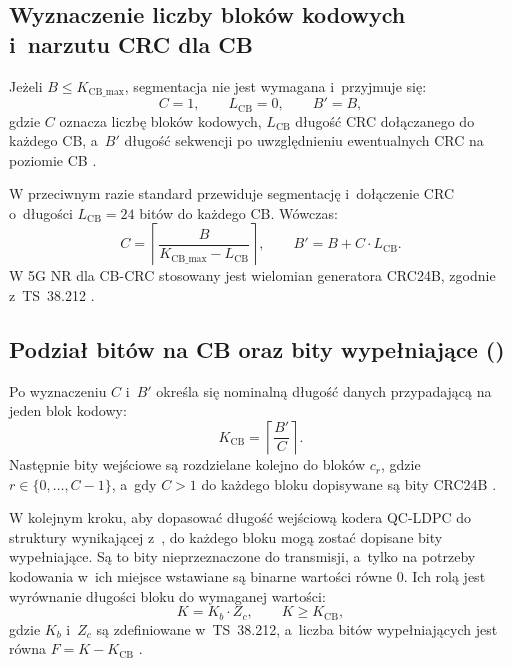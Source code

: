 \subsection{Wyznaczenie liczby bloków kodowych i~narzutu CRC dla CB}
Jeżeli $B \le K_{\mathrm{CB\_max}}$, segmentacja nie jest wymagana i~przyjmuje się:
\begin{equation}
C = 1,\qquad L_{\mathrm{CB}} = 0,\qquad B' = B,
\label{eq:seg_case_no}
\end{equation}
gdzie $C$ oznacza liczbę bloków kodowych, $L_{\mathrm{CB}}$ długość CRC dołączanego do każdego CB, a~$B'$ długość sekwencji po uwzględnieniu ewentualnych CRC na poziomie CB \cite{bib:3gpp_38212}.

W przeciwnym razie standard przewiduje segmentację i~dołączenie CRC o~długości $L_{\mathrm{CB}} = 24$ bitów do każdego CB. Wówczas:
\begin{equation}
C = \left\lceil \frac{B}{K_{\mathrm{CB\_max}} - L_{\mathrm{CB}}} \right\rceil,\qquad
B' = B + C \cdot L_{\mathrm{CB}}.
\label{eq:seg_case_yes}
\end{equation}
W 5G NR dla CB-CRC stosowany jest wielomian generatora CRC24B, zgodnie z~TS~38.212 \cite{bib:3gpp_38212}.

\subsection{Podział bitów na CB oraz bity wypełniające ()}
Po wyznaczeniu $C$ i~$B'$ określa się nominalną długość danych przypadającą na jeden blok kodowy:
\begin{equation}
K_{\mathrm{CB}} = \left\lceil\frac{B'}{C}\right\rceil.
\label{eq:seg_kprime}
\end{equation}
Następnie bity wejściowe są rozdzielane kolejno do bloków $c_r$, gdzie $r \in \{0,\dots,C-1\}$, a~gdy $C>1$ do każdego bloku dopisywane są bity CRC24B \cite{bib:3gpp_38212}.

W kolejnym kroku, aby dopasować długość wejściową kodera QC-LDPC do struktury wynikającej z~, do każdego bloku mogą zostać dopisane bity wypełniające. Są to bity nieprzeznaczone do transmisji, a~tylko na potrzeby kodowania w~ich miejsce wstawiane są binarne wartości równe 0. Ich rolą jest wyrównanie długości bloku do wymaganej wartości:
\begin{equation}
K = K_b \cdot Z_c,\qquad K \ge K_{\mathrm{CB}},
\label{eq:seg_k_lift}
\end{equation}
gdzie $K_b$ i~$Z_c$ są zdefiniowane w~TS~38.212, a~liczba bitów wypełniających jest równa $F = K - K_{\mathrm{CB}}$ \cite{bib:3gpp_38212}.

